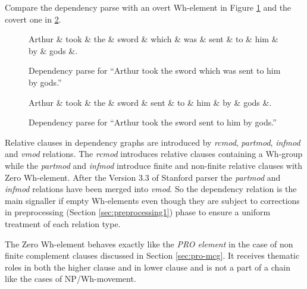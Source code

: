 Compare the dependency parse with an overt Wh-element in Figure \ref{fig:e20} and the covert one in \ref{fig:e21}.
\begin{figure}[H]
	\centering
	\begin{dependency}
		\begin{deptext}[]
			Arthur \& took \& the \& sword \& which \& was \& sent \& to \& him \& by \& gods \&. \\
		\end{deptext}
	\end{dependency}
	\caption{Dependency parse for ``Arthur took the sword which was sent to him by gods.''}
	\label{fig:e20}
\end{figure}
\begin{figure}[H]
	\centering
	\begin{dependency}
		\begin{deptext}[]
			Arthur \& took \& the \& sword \& sent \& to \& him \& by \& gods \&. \\
		\end{deptext}
	\end{dependency}
	\caption{Dependency parse for ``Arthur took the sword sent to him by gods.''}
	\label{fig:e21}
\end{figure}

Relative clauses in dependency graphs are introduced by \textit{rcmod}, \textit{partmod}, \textit{infmod} and \textit{vmod} relations. The \textit{rcmod} introduces relative clauses containing a Wh-group while the \textit{partmod} and \textit{infmod} introduce finite and non-finite relative clauses with Zero Wh-element. After the Version 3.3 of Stanford parser the \textit{partmod} and \textit{infmod} relations have been merged into \textit{vmod}. So the dependency relation is the main signaller if empty Wh-elements even though  they are subject to corrections in preprocessing (Section \ref{sec:preprocessing1}) phase to ensure a uniform treatment of each relation type.

The Zero Wh-element behaves exactly like the \textit{PRO element} in the case of non finite complement clauses discussed in Section \ref{sec:pro-mcg}. It receives thematic roles in both the higher clause and in lower clause and is not a part of a chain like the cases of NP/Wh-movement.

